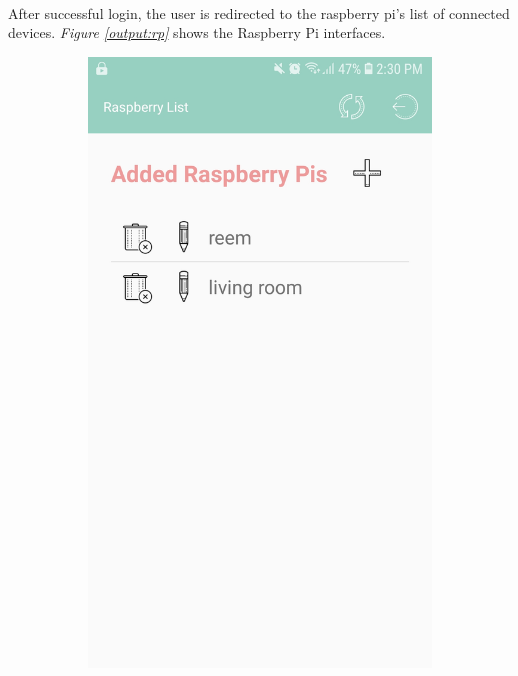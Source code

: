 \documentclass[12pt]{paper}
\begin{document}
		\paragraph{} After successful login, the user is redirected to the raspberry pi's list of connected devices. \textit{Figure \ref{output:rp}} shows the Raspberry Pi interfaces. 
		\begin{figure}[H]
			\centering
			\begin{subfigure}[b]{.4\linewidth}
				\includegraphics[width=\linewidth]{img/output_raspberry_list.jpg}

\end{subfigure}
\end{figure}
\end{document}
